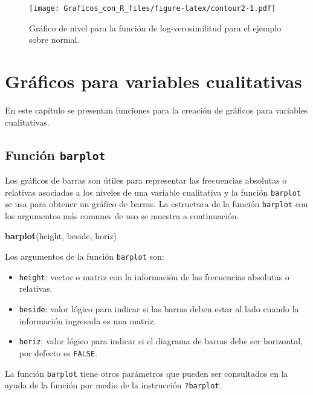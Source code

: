 \documentclass[10pt,]{krantz}
\makeatletter
\newenvironment{Shaded}{\begin{snugshade}}{\end{snugshade}}
\newcommand{\KeywordTok}[1]{\textcolor[rgb]{0.13,0.29,0.53}{\textbf{{#1}}}}
\newcommand{\NormalTok}[1]{{#1}}
\providecommand{\tightlist}{%
  \setlength{\itemsep}{0pt}\setlength{\parskip}{0pt}}
\newenvironment{kframe}{%
\medskip{}
\setlength{\fboxsep}{.8em}
 \def\at@end@of@kframe{}%
 \ifinner\ifhmode%
  \def\at@end@of@kframe{\end{minipage}}%
  \begin{minipage}{\columnwidth}%
 \fi\fi%
 \def\FrameCommand##1{\hskip\@totalleftmargin \hskip-\fboxsep
 \colorbox{shadecolor}{##1}\hskip-\fboxsep
     \hskip-\linewidth \hskip-\@totalleftmargin \hskip\columnwidth}%
 \MakeFramed {\advance\hsize-\width
   \@totalleftmargin\z@ \linewidth\hsize
   \@setminipage}}%
 {\par\unskip\endMakeFramed%
 \at@end@of@kframe}
\renewenvironment{Shaded}{\begin{kframe}}{\end{kframe}}
\makeatother
\begin{document}
\begin{figure}[htbp]
\centering
\texttt{[image: Graficos\_con\_R\_files/figure-latex/contour2-1.pdf]}
\caption{\label{fig:contour2}Gráfico de nivel para la función de
log-verosimilitud para el ejemplo sobre normal.}
\end{figure}

\chapter{Gráficos para variables
cualitativas}\label{graficos-para-variables-cualitativas}

En este capítulo se presentan funciones para la creación de gráficos
para variables cualitativas.

\section{\texorpdfstring{Función \texttt{barplot}
}{Función barplot  }}\label{funcion-barplot}

Los gráficos de barras son útiles para representar las frecuencias
absolutas o relativas asociadas a los niveles de una variable
cualitativa y la función \texttt{barplot} se usa para obtener un gráfico
de barras. La estructura de la función \texttt{barplot} con los
argumentos más comunes de uso se muestra a continuación.

\begin{Shaded}
\begin{Highlighting}[]
\KeywordTok{barplot}\NormalTok{(height, beside, horiz)}
\end{Highlighting}
\end{Shaded}

Los argumentos de la función \texttt{barplot} son:

\begin{itemize}
\tightlist
\item
  \texttt{height}: vector o matriz con la información de las frecuencias
  absolutas o relativas.
\item
  \texttt{beside}: valor lógico para indicar si las barras deben estar
  al lado cuando la información ingresada es una matriz.
\item
  \texttt{horiz}: valor lógico para indicar si el diagrama de barras
  debe ser horizontal, por defecto es \texttt{FALSE}.
\end{itemize}

La función \texttt{barplot} tiene otros parámetros que pueden ser
consultados en la ayuda de la función por medio de la instrucción
\texttt{?barplot}.
\end{document}
